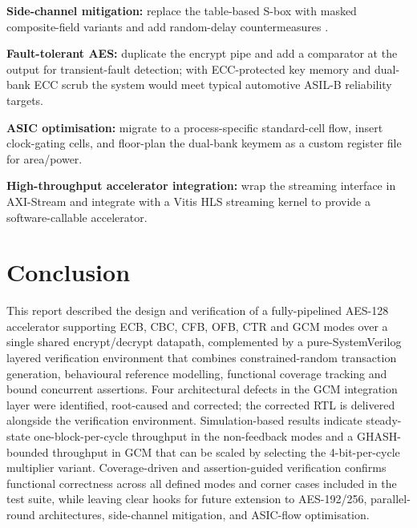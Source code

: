 \documentclass[conference,10pt,a4paper]{IEEEtran}
\begin{document}
\textbf{Side-channel mitigation:} replace the table-based S-box with
masked composite-field variants and add random-delay countermeasures
\cite{hwang2018}.

\textbf{Fault-tolerant AES:} duplicate the encrypt pipe and add a
comparator at the output for transient-fault detection; with
ECC-protected key memory and dual-bank ECC scrub the system would meet
typical automotive ASIL-B reliability targets.

\textbf{ASIC optimisation:} migrate to a process-specific standard-cell
flow, insert clock-gating cells, and floor-plan the dual-bank keymem
as a custom register file for area/power.

\textbf{High-throughput accelerator integration:} wrap the
streaming interface in AXI-Stream and integrate with a Vitis HLS
streaming kernel to provide a software-callable accelerator.

\section{Conclusion}
\label{sec:conclusion}

This report described the design and verification of a fully-pipelined
AES-128 accelerator supporting ECB, CBC, CFB, OFB, CTR and GCM modes
over a single shared encrypt/decrypt datapath, complemented by a
pure-SystemVerilog layered verification environment that combines
constrained-random transaction generation, behavioural reference
modelling, functional coverage tracking and bound concurrent
assertions.  Four architectural defects in the GCM integration layer
were identified, root-caused and corrected; the corrected RTL is
delivered alongside the verification environment.  Simulation-based
results indicate steady-state one-block-per-cycle throughput in the
non-feedback modes and a GHASH-bounded throughput in GCM that can be
scaled by selecting the 4-bit-per-cycle multiplier variant.
Coverage-driven and assertion-guided verification confirms functional
correctness across all defined modes and corner cases included in the
test suite, while leaving clear hooks for future extension to
AES-192/256, parallel-round architectures, side-channel mitigation,
and ASIC-flow optimisation.



\end{document}
